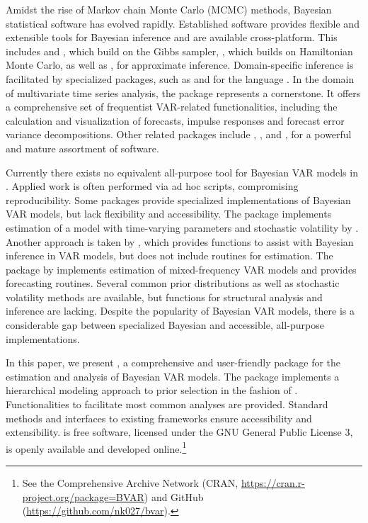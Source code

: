 \documentclass[article,nojss]{jss} %
\begin{document}
Amidst the rise of Markov chain Monte Carlo (MCMC) methods, Bayesian statistical software has evolved rapidly. Established software provides flexible and extensible tools for Bayesian inference and are available cross-platform. This includes  \citep{lunn2000, lunn2009} and  \citep{plummer2003}, which build on the Gibbs sampler,  \citep{carpenter2017}, which builds on Hamiltonian Monte Carlo, as well as  \citep{rue2015}, for approximate inference.
Domain-specific inference is facilitated by specialized packages, such as  \citep{hadfield2010} and  \citep{burkner2018} for the  language \citep{R}.
In the domain of multivariate time series analysis, the  package  \citep{pfaff2008} represents a cornerstone. It offers a comprehensive set of frequentist VAR-related functionalities, including the calculation and visualization of forecasts, impulse responses and forecast error variance decompositions. Other related packages include  \citep{tsay2018},  \citep{nicholson2019}, and  \citep{dinarzo2020}, for a powerful and mature assortment of software.

Currently there exists no equivalent all-purpose tool for Bayesian VAR models in . Applied work is often performed via ad hoc scripts, compromising reproducibility. Some  packages provide specialized implementations of Bayesian VAR models, but lack flexibility and accessibility.
The  package \citep{krueger2015} implements estimation of a model with time-varying parameters and stochastic volatility by \cite{primiceri2005}. Another approach is taken by  \citep{mohr2019}, which provides functions to assist with Bayesian inference in VAR models, but does not include routines for estimation.
The  package by \cite{ankargren2019} implements estimation of mixed-frequency VAR models and provides forecasting routines. Several common prior distributions as well as stochastic volatility methods are available, but functions for structural analysis and inference are lacking.
Despite the popularity of Bayesian VAR models, there is a considerable gap between specialized Bayesian and accessible, all-purpose implementations.

In this paper, we present , a comprehensive and user-friendly  package for the estimation and analysis of Bayesian VAR models. The package implements a hierarchical modeling approach to prior selection in the fashion of \cite{giannone2015}. Functionalities to facilitate most common analyses are provided. Standard methods and interfaces to existing frameworks ensure accessibility and extensibility.  is free software, licensed under the GNU General Public License 3, is openly available and developed online.\footnote{See the Comprehensive  Archive Network (CRAN, \url{https://cran.r-project.org/package=BVAR}) and GitHub (\url{https://github.com/nk027/bvar}).}
\end{document}
